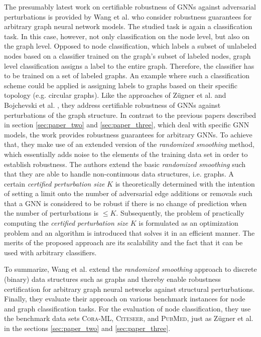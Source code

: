 \documentclass[a4paper,preprint]{sig-alternate}
\begin{document}
The presumably latest work on certifiable robustness of GNNs against adversarial perturbations is provided by Wang et al. \cite{Wang_2020}
who consider robustness guarantees for arbitrary graph neural network models. The studied task is again a classification task.
In this case, however, not only classification on the node level, but also on the graph level.
Opposed to node classification, which labels a subset of unlabeled nodes based on a classifier trained on the graph's subset of labeled nodes,
graph level classification assigns a label to the entire graph. \cite{Wang_2020} 
Therefore, the classifier has to be trained on a set of labeled graphs.
An example where such a classification scheme could be applied is assigning labels to graphs based on their specific topology
(e.g. circular graphs).
Like the approaches of Zügner et al. \cite{10.1145/3394486.3403217} and Bojchevski et al. \cite{bojchevski2019certifiable},
they address certifiable robustness of GNNs against perturbations of the graph structure. 
In contrast to the previous papers described in section \ref{sec:paper_two}
and \ref{sec:paper_three}, which deal with specific GNN models, the work provides robustness guarantees for arbitrary GNNs.
To achieve that, they make use of an extended version of the \textit{randomized smoothing} method, which essentially adds noise 
to the elements of the training data set in order to establish robustness. \cite{Wang_2020}
The authors extend the basic \textit{randomized smoothing} such that they are able to handle non-continuous data structures, i.e. graphs.
A certain \textit{certified perturbation size} $K$ is theoretically determined with the intention of setting a limit onto the number of adversarial edge additions
or removals such that a GNN is considered to be robust if there is no change of prediction when the number of perturbations is $\leq K$. \cite{Wang_2020}
Subsequently, the problem of practically computing the \textit{certified perturbation size} $K$ is formulated as an optimization problem 
and an algorithm is introduced that solves it in an efficient manner.
The merits of the proposed approach are its scalability and the fact that it can be used with arbitrary classifiers. \cite{Wang_2020} \newline

To summarize, Wang et al. extend the \textit{randomized smoothing} approach to discrete (binary) data structures such as graphs 
and thereby enable robustness certification for arbitrary graph neural networks against structural perturbations.
Finally, they evaluate their approach on various benchmark instances for node and graph classification tasks.
For the evaluation of node classification, they use the benchmark data sets \textsc{Cora-ML}, \textsc{Citeseer}, and \textsc{PubMed},
just as Zügner et al. in the sections \ref{sec:paper_two} and \ref{sec:paper_three}.
\end{document}

